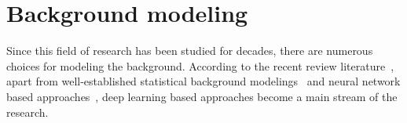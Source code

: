 \documentclass[11pt]{hyu_thesis}
\begin{document}
\section{Background modeling}
Since this field of research has been studied for decades, there are numerous choices for modeling the background. According to the recent review literature~\cite{bouwmans2018deep}, apart from well-established statistical background modelings~\cite{Zivkovic2004,Zivkovic2006,Barnich2009ViBe,Barnich2011ViBe,VanDroogenbroeck2012Background,VanDroogenbroeck2014ViBe,Hofmann2012,Muchtar2018} and neural network based approaches~\cite{maddalena2008self,maddalena2012sobs}, deep learning based approaches become a main stream of the research. %
\end{document}
